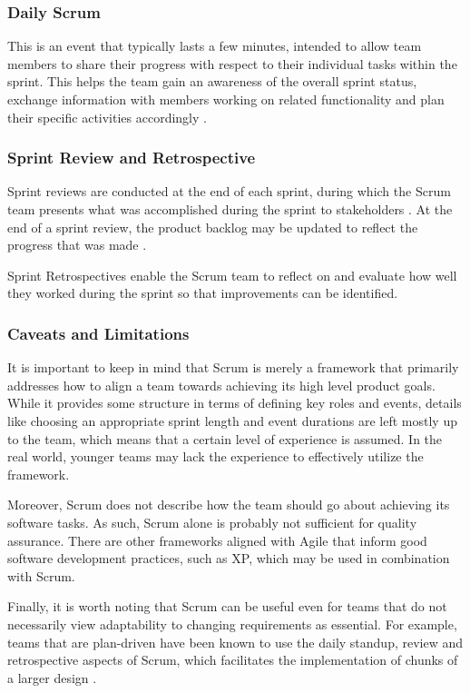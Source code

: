 \documentclass[11pt]{article}
\begin{document}
        \subsubsection{Daily Scrum}
        This is an event that typically lasts a few minutes, intended to allow team members to share their progress with respect to their individual tasks within the sprint. This helps the team gain an awareness of the overall sprint status, exchange information with members working on related functionality and plan their specific activities accordingly \citet{sethi}.
       
        \subsubsection{Sprint Review and Retrospective}
        Sprint reviews are conducted at the end of each sprint, during which the Scrum team presents what was accomplished during the sprint to stakeholders \citet{sethi}. At the end of a sprint review, the product backlog may be updated to reflect the progress that was made \citet{sethi}.

        Sprint Retrospectives enable the Scrum team to reflect on and evaluate how well they worked during the sprint so that improvements can be identified.
        
        \subsubsection{Caveats and Limitations}
        It is important to keep in mind that Scrum is merely a framework that primarily addresses how to align a team towards achieving its high level product goals. While it provides some structure in terms of defining key roles and events, details like choosing an appropriate sprint length and event durations are left mostly up to the team, which means that a certain level of experience is assumed. In the real world, younger teams may lack the experience to effectively utilize the framework.
        
        Moreover, Scrum does not describe how the team should go about achieving its software tasks. As such, Scrum alone is probably not sufficient for quality assurance. There are other frameworks aligned with Agile that inform good software development practices, such as XP, which may be used in combination with Scrum.

        Finally, it is worth noting that Scrum can be useful even for teams that do not necessarily view adaptability to changing requirements as essential. For example, teams that are plan-driven have been known to use the daily standup, review and retrospective aspects of Scrum, which facilitates the implementation of chunks of a larger design \citet{sethi}.
\end{document}
